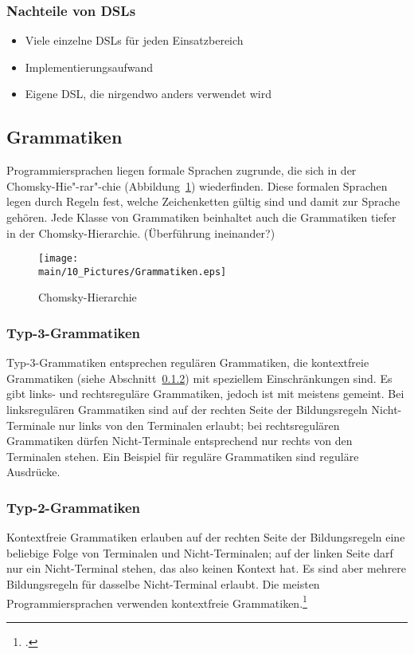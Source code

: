 \documentclass[../InterneDSLs.tex]{subfiles}
\begin{document}
\subsubsection{Nachteile von DSLs}
\begin{itemize}
	\item Viele einzelne DSLs für jeden Einsatzbereich
	\item Implementierungsaufwand
	\item Eigene DSL, die nirgendwo anders verwendet wird
\end{itemize}


\subsection{Grammatiken}
Programmiersprachen liegen formale Sprachen zugrunde, die sich in der Chomsky-Hie"-rar"-chie (Abbildung~\ref{fig:chomkskyhierarchie}) wiederfinden. Diese formalen Sprachen legen durch Regeln fest, welche Zeichenketten gültig sind und damit zur Sprache gehören. Jede Klasse von Grammatiken beinhaltet auch die Grammatiken tiefer in der Chomsky-Hierarchie. (Überführung ineinander?)

\begin{figure}
\centering
\texttt{[image: \\main/10\_Pictures/Grammatiken.eps]}
\caption{Chomsky-Hierarchie}
\label{fig:chomkskyhierarchie}
\end{figure}

\subsubsection{Typ-3-Grammatiken}\label{sec:refulaeregrammatik}
Typ-3-Grammatiken entsprechen regulären Grammatiken, die kontextfreie Grammatiken (siehe Abschnitt~\ref{sec:kontextfreiegrammatik}) mit speziellem Einschränkungen sind. Es gibt links- und rechtsreguläre Grammatiken, jedoch ist mit  meistens  gemeint. Bei linksregulären Grammatiken sind auf der rechten Seite der Bildungsregeln Nicht-Terminale nur links von den Terminalen erlaubt; bei rechtsregulären Grammatiken dürfen Nicht-Terminale entsprechend nur rechts von den Terminalen stehen. Ein Beispiel für reguläre Grammatiken sind reguläre Ausdrücke.

\subsubsection{Typ-2-Grammatiken}\label{sec:kontextfreiegrammatik}
Kontextfreie Grammatiken erlauben auf der rechten Seite der Bildungsregeln eine beliebige Folge von Terminalen und Nicht-Terminalen; auf der linken Seite darf nur ein Nicht-Terminal stehen, das also keinen Kontext hat. Es sind aber mehrere Bildungsregeln für dasselbe Nicht-Terminal erlaubt. Die meisten Programmiersprachen verwenden kontextfreie Grammatiken.\footcite{Fowler.2010}
\end{document}
